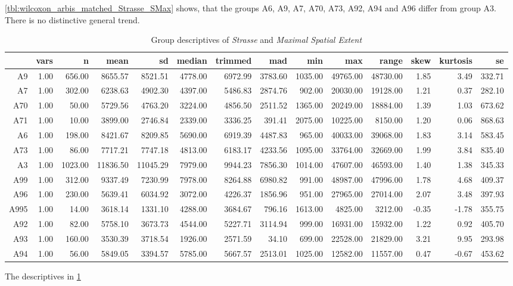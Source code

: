 \cref{tbl:wilcoxon_arbis_matched_Strasse_SMax} shows, that the groups A6, A9, A7, A70, A73, A92, A94 and A96 differ from group A3. There is no distinctive general trend.
\begin{table}[ht!]
	\tiny
	\centering
  \begin{tabular}{rrrrrrrrrrrrrr}
    \hline
    & vars & n & mean & sd & median & trimmed & mad & min & max & range & skew & kurtosis & se \\ 
    \hline
    A9   & 1.00 & 656.00 & 8655.57 & 8521.51 & 4778.00 & 6972.99 & 3783.60 & 1035.00 & 49765.00 & 48730.00 & 1.85 & 3.49 & 332.71 \\ 
    A7   & 1.00 & 302.00 & 6238.63 & 4902.30 & 4397.00 & 5486.83 & 2874.76 & 902.00 & 20030.00 & 19128.00 & 1.21 & 0.37 & 282.10 \\ 
    A70  & 1.00 & 50.00 & 5729.56 & 4763.20 & 3224.00 & 4856.50 & 2511.52 & 1365.00 & 20249.00 & 18884.00 & 1.39 & 1.03 & 673.62 \\ 
    A71  & 1.00 & 10.00 & 3899.00 & 2746.84 & 2339.00 & 3336.25 & 391.41 & 2075.00 & 10225.00 & 8150.00 & 1.20 & 0.06 & 868.63 \\ 
    A6   & 1.00 & 198.00 & 8421.67 & 8209.85 & 5690.00 & 6919.39 & 4487.83 & 965.00 & 40033.00 & 39068.00 & 1.83 & 3.14 & 583.45 \\ 
    A73  & 1.00 & 86.00 & 7717.21 & 7747.18 & 4813.00 & 6183.17 & 4233.56 & 1095.00 & 33764.00 & 32669.00 & 1.99 & 3.84 & 835.40 \\ 
    A3   & 1.00 & 1023.00 & 11836.50 & 11045.29 & 7979.00 & 9944.23 & 7856.30 & 1014.00 & 47607.00 & 46593.00 & 1.40 & 1.38 & 345.33 \\ 
    A99  & 1.00 & 312.00 & 9337.49 & 7230.99 & 7978.00 & 8264.88 & 6980.82 & 991.00 & 48987.00 & 47996.00 & 1.78 & 4.68 & 409.37 \\ 
    A96  & 1.00 & 230.00 & 5639.41 & 6034.92 & 3072.00 & 4226.37 & 1856.96 & 951.00 & 27965.00 & 27014.00 & 2.07 & 3.48 & 397.93 \\ 
    A995 & 1.00 & 14.00 & 3618.14 & 1331.10 & 4288.00 & 3684.67 & 796.16 & 1613.00 & 4825.00 & 3212.00 & -0.35 & -1.78 & 355.75 \\ 
    A92  & 1.00 & 82.00 & 5758.10 & 3673.73 & 4544.00 & 5227.71 & 3114.94 & 999.00 & 16931.00 & 15932.00 & 1.22 & 0.92 & 405.70 \\ 
    A93  & 1.00 & 160.00 & 3530.39 & 3718.54 & 1926.00 & 2571.59 & 34.10 & 699.00 & 22528.00 & 21829.00 & 3.21 & 9.95 & 293.98 \\ 
    A94  & 1.00 & 56.00 & 5849.05 & 3394.57 & 5785.00 & 5667.57 & 2513.01 & 1025.00 & 12582.00 & 11557.00 & 0.47 & -0.67 & 453.62 \\ 
    \hline
  \end{tabular}
	\caption{Group descriptives of \textit{Strasse} and \textit{Maximal Spatial Extent}}
	\label{tbl:descriptives_arbis_matched_Strasse_SMax}
\end{table}
The descriptives in \cref{tbl:descriptives_arbis_matched_Strasse_SMax}


